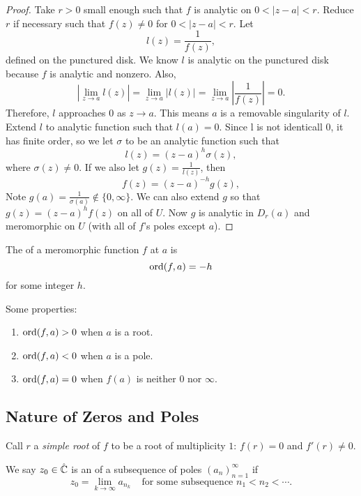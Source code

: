 \begin{proof}
    Take $r > 0$ small enough such that $f$ is analytic
    on $0 < |z-a| < r$.
    Reduce $r$ if necessary such that $f(z) \ne 0$ for
    $0 < |z-a| < r$.
    Let 
    \[ l(z) = \frac{1}{f(z)}, \]
    defined on the punctured disk.  
    We know $l$ is analytic on the punctured disk because
    $f$ is analytic and nonzero.
    Also,
    \[ \left| \lim_{z \to a} l(z) \right|
        = \lim_{z \to a} |l(z)|
        = \lim_{z \to a} \left| \frac{1}{f(z)}\right|
        = 0.
    \]
    Therefore, $l$ approaches $0$ as $z \to a$.
    This means $a$ is a removable singularity of $l$.
    Extend $l$ to analytic function such that $l(a) = 0$.
    Since l is not identicall $0$, it has finite order, so we 
    let $\sigma$ to be an analytic function such that
    \[ l(z) = (z-a)^h \sigma(z), \]
    where $\sigma(z) \ne 0$.
    If we also let $g(z) = \frac{1}{l(z)}$, then
    \[ f(z) = (z-a)^{-h} g(z), \]
    Note $g(a) = \frac{1}{\sigma(a)} \notin \{0, \infty \}$.
    We can also extend $g$ so that $g(z) = (z-a)^hf(z)$ 
    on all of $U$.
    Now $g$ is analytic in $D_r(a)$ and meromorphic on $U$
    (with all of $f$'s poles except $a$).
\end{proof}

\begin{definition}
    The  of a meromorphic function $f$ at 
    $a$ is 
    \[ \operatorname{ord}(f, a) = -h \]
    for some integer $h$.
\end{definition}

Some properties:
\begin{enumerate}
    \item $\operatorname{ord}(f, a) > 0$ when $a$ is a root.
    \item $\operatorname{ord}(f, a) < 0$ when $a$ is a pole.
    \item $\operatorname{ord}(f, a) = 0$ when $f(a)$ is neither $0$ nor
        $\infty$.
\end{enumerate}



\subsection{Nature of Zeros and Poles}

Call $r$ a \emph{simple root} of $f$ to be a root of 
multiplicity $1$: $f(r) = 0$ and $f'(r) \ne 0$.

\begin{definition}
    We say $z_0 \in \hat{\operatorname{\mathbb{C}}}$ is an 
    of a subsequence of poles $(a_n)_{n=1}^{\infty}$ if
    \[ z_0 = \lim_{k \to \infty} a_{n_k} \;\;\;\; \text{for 
    some subsequence $n_1 < n_2 < \cdots$}. \]
\end{definition}

